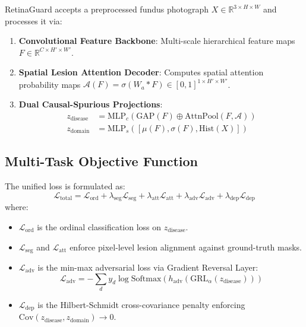 \documentclass[journal,compsoc]{IEEEtran}
\begin{document}
RetinaGuard accepts a preprocessed fundus photograph $X \in \mathbb{R}^{3 \times H \times W}$ and processes it via:
\begin{enumerate}
    \item \textbf{Convolutional Feature Backbone}: Multi-scale hierarchical feature maps $F \in \mathbb{R}^{C \times H' \times W'}$.
    \item \textbf{Spatial Lesion Attention Decoder}: Computes spatial attention probability maps $\mathcal{A}(F) = \sigma(W_a * F) \in [0, 1]^{1 \times H' \times W'}$.
    \item \textbf{Dual Causal-Spurious Projections}:
    \begin{align}
        z_{\text{disease}} &= \text{MLP}_c\left( \text{GAP}(F) \oplus \text{AttnPool}(F, \mathcal{A}) \right) \\
        z_{\text{domain}} &= \text{MLP}_s\left( [\mu(F), \sigma(F), \text{Hist}(X)] \right)
    \end{align}
\end{enumerate}

\subsection{Multi-Task Objective Function}
The unified loss is formulated as:
\begin{equation}
    \mathcal{L}_{\text{total}} = \mathcal{L}_{\text{ord}} + \lambda_{\text{seg}} \mathcal{L}_{\text{seg}} + \lambda_{\text{att}} \mathcal{L}_{\text{att}} + \lambda_{\text{adv}} \mathcal{L}_{\text{adv}} + \lambda_{\text{dep}} \mathcal{L}_{\text{dep}}
\end{equation}
where:
\begin{itemize}
    \item $\mathcal{L}_{\text{ord}}$ is the ordinal classification loss on $z_{\text{disease}}$.
    \item $\mathcal{L}_{\text{seg}}$ and $\mathcal{L}_{\text{att}}$ enforce pixel-level lesion alignment against ground-truth masks.
    \item $\mathcal{L}_{\text{adv}}$ is the min-max adversarial loss via Gradient Reversal Layer:
    \begin{equation}
        \mathcal{L}_{\text{adv}} = -\sum_{d} y_d \log \text{Softmax}(h_{\text{adv}}(\text{GRL}_\alpha(z_{\text{disease}})))
    \end{equation}
    \item $\mathcal{L}_{\text{dep}}$ is the Hilbert-Schmidt cross-covariance penalty enforcing $\text{Cov}(z_{\text{disease}}, z_{\text{domain}}) \to 0$.
\end{itemize}
\end{document}
